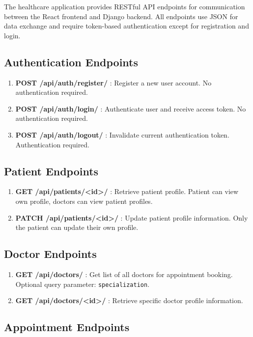 \documentclass[11pt,a4paper]{article}
\begin{document}
The healthcare application provides RESTful API endpoints for communication between the React frontend and Django backend. All endpoints use JSON for data exchange and require token-based authentication except for registration and login.


\subsection{Authentication Endpoints}

\begin{enumerate}
    \item \textbf{POST /api/auth/register/} : Register a new user account. No authentication required.
    \item \textbf{POST /api/auth/login/} : Authenticate user and receive access token. No authentication required.
    \item \textbf{POST /api/auth/logout/} : Invalidate current authentication token. Authentication required.
\end{enumerate}

\subsection{Patient Endpoints}

\begin{enumerate}
    \item \textbf{GET /api/patients/<id>/} : Retrieve patient profile. Patient can view own profile, doctors can view patient profiles.
    \item \textbf{PATCH /api/patients/<id>/} : Update patient profile information. Only the patient can update their own profile.
\end{enumerate}

\subsection{Doctor Endpoints}

\begin{enumerate}
    \item \textbf{GET /api/doctors/} : Get list of all doctors for appointment booking. Optional query parameter: \texttt{specialization}.
    \item \textbf{GET /api/doctors/<id>/} : Retrieve specific doctor profile information.
\end{enumerate}

\subsection{Appointment Endpoints}
\end{document}
